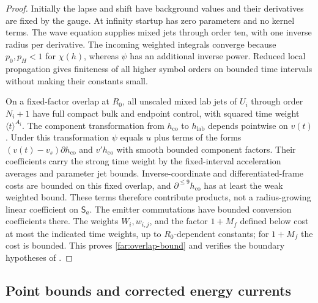 \begin{proof}
Initially the lapse and shift have background values and their
derivatives are fixed by the gauge.  At infinity startup has zero
parameters and no kernel terms.  The wave equation supplies mixed jets
through order ten, with one inverse radius per derivative.  The incoming
weighted integrals converge because $p_0,p_H<1$ for $\chi(h)$, whereas
$\psi$ has an additional inverse power.  Reduced local propagation gives
finiteness of all higher symbol orders on bounded time intervals without
making their constants small.

On a fixed-factor overlap at $R_0$, all unscaled mixed lab jets of $U_i$
through order $N_i+1$ have full compact bulk and endpoint control, with
squared time weight $\langle t\rangle^{A_i}$.  The component transformation
from $h_{\mathrm{co}}$ to $h_{\mathrm{lab}}$ depends pointwise on $v(t)$.
Under this transformation $\psi$ equals $u$ plus terms of the forms
$(v(t)-v_s)\partial h_{\mathrm{co}}$ and $v'h_{\mathrm{co}}$ with smooth
bounded component factors.  Their coefficients carry the strong time
weight by the fixed-interval acceleration averages and parameter jet
bounds.  Inverse-coordinate and differentiated-frame costs are bounded
on this fixed overlap, and $\partial^{\le9}h_{\mathrm{co}}$ has at least
the weak weighted bound.  These terms therefore contribute products,
not a radius-growing linear coefficient on $\mathsf S_a$.
The emitter commutations have bounded conversion coefficients there.
The weights $W_i,w_{i,j}$, and the factor $1+M_f$ defined below cost at
most the indicated time weights, up to $R_0$-dependent constants; for
$1+M_f$ the cost is bounded.  This proves \eqref{far:overlap-bound} and
verifies the boundary hypotheses of .
\end{proof}

\subsection{Point bounds and corrected energy currents}

